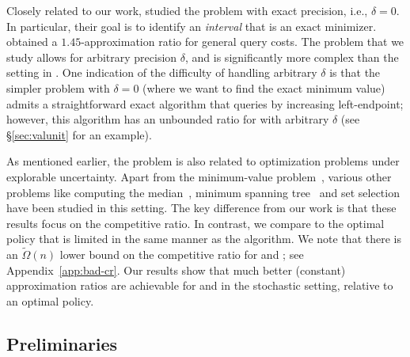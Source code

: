 \documentclass[11pt]{article}
\theoremstyle{remark}
\theoremstyle{plain}
\theoremstyle{remark}
\begin{document}
 Closely related  to our work,   \cite{CHAPLICK2021} studied the \smqi problem with exact precision, i.e., $\delta=0$. In particular, their goal is to identify an {\em interval} that is an  exact minimizer.  
\cite{CHAPLICK2021} obtained a $1.45$-approximation ratio for general query costs. The \smqi problem that we study allows for arbitrary precision $\delta$, and is significantly more complex than the setting in \cite{CHAPLICK2021}. One indication of the difficulty of handling arbitrary $\delta$ is that    the simpler \smq problem   with $\delta=0$ (where we want to find the exact minimum value) admits a  straightforward exact algorithm that  queries by increasing left-endpoint; however,  this algorithm has an unbounded ratio for  \smq with arbitrary  $\delta$ (see \S\ref{sec:valunit} for an  example). 


As mentioned earlier, the \smq problem is also  related to 
optimization problems  
under  explorable uncertainty.  
Apart from the   minimum-value problem~\cite{kahan1991model},  various other problems like computing the median~\cite{feder2000computing}, minimum spanning tree~\cite{MSTerlebach2008,MSTmegow2017randomization} and set selection~\cite{erlebach2016query,BampisDELMS21,megow2023set} have been studied in this setting. 
The key difference from our work is that  these results focus on the competitive ratio. In contrast,  we compare to the optimal policy that is limited in the same manner as the algorithm.   We note that there is an $\tilde{\Omega}(n)$ lower bound on the  competitive ratio  for \smq and \smqi; see Appendix~\ref{app:bad-cr}. Our results show that much better (constant) approximation ratios are achievable for \smq and \smqi in the stochastic setting, relative  to an optimal policy. 





\subsection{Preliminaries}\label{subsec:prelim}
\end{document}
